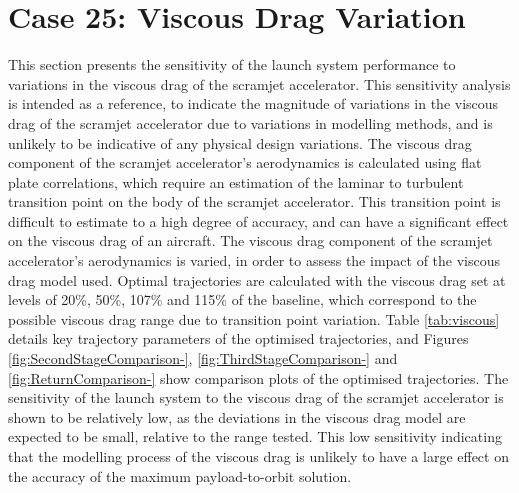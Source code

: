 \chapter{Case 25: Viscous Drag Variation}
This section presents the sensitivity of the launch system performance to variations in the viscous drag of the scramjet accelerator. This sensitivity analysis is intended as a reference, to indicate the magnitude of variations in the viscous drag of the scramjet accelerator due to variations in modelling methods, and is unlikely to be indicative of any physical design variations.
The viscous drag component of the scramjet accelerator's aerodynamics is calculated using flat plate correlations, which require an estimation of the laminar to turbulent transition point on the body of the scramjet accelerator\cite{Ward2018}. This transition point is difficult to estimate to a high degree of accuracy, and can have a significant effect on the viscous drag of an aircraft\cite{Ward2018}.
The viscous drag component of the scramjet accelerator's aerodynamics is varied, in order to assess the impact of the viscous drag model used. Optimal trajectories are calculated with the viscous drag set at levels of 20\%, 50\%, 107\% and 115\% of the baseline, which correspond to the possible viscous drag range due to transition point variation. Table \ref{tab:viscous} details key trajectory parameters of the optimised trajectories, and Figures \ref{fig:SecondStageComparison-}, \ref{fig:ThirdStageComparison-} and \ref{fig:ReturnComparison-} show comparison plots of the optimised trajectories. The sensitivity of the launch system to the viscous drag of the scramjet accelerator is shown to be relatively low, as the deviations in the viscous drag model are expected to be small, relative to the range tested. This low sensitivity indicating that the modelling process of the viscous drag is unlikely to have a large effect on the accuracy of the maximum payload-to-orbit solution.

